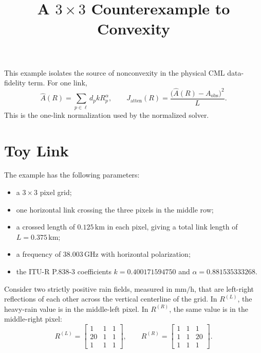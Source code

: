 \documentclass[11pt]{article}
\title{A $3\times3$ Counterexample to Convexity}
\author{}
\date{}
\begin{document}
\maketitle

This example isolates the source of nonconvexity in the physical CML
data-fidelity term. For one link,
\begin{equation}
    \widehat{A}(R)
    = \sum_{p\in\ell} d_p k R_p^\alpha,
    \qquad
    J_{\mathrm{atten}}(R)
    = \frac{\bigl(\widehat{A}(R)-A_{\mathrm{obs}}\bigr)^2}{L}.
\end{equation}
This is the one-link normalization used by the normalized solver.

\section{Toy Link}

The example has the following parameters:
\begin{itemize}
    \item a $3\times3$ pixel grid;
    \item one horizontal link crossing the three pixels in the middle row;
    \item a crossed length of $0.125\,\mathrm{km}$ in each pixel, giving a
          total link length of $L=0.375\,\mathrm{km}$;
    \item a frequency of $38.003\,\mathrm{GHz}$ with horizontal polarization;
    \item the ITU-R P.838-3 coefficients
          $k=0.400171594750$ and $\alpha=0.881535333268$.
\end{itemize}

Consider two strictly positive rain fields, measured in
$\mathrm{mm}/\mathrm{h}$, that are left-right reflections of each other
across the vertical centerline of the grid. In $R^{(L)}$, the heavy-rain
value is in the middle-left pixel. In $R^{(R)}$, the same value is in the
middle-right pixel:
\begin{equation}
    R^{(L)} =
    \begin{bmatrix}
        1 & 1 & 1 \\
        20 & 1 & 1 \\
        1 & 1 & 1
    \end{bmatrix},
    \qquad
    R^{(R)} =
    \begin{bmatrix}
        1 & 1 & 1 \\
        1 & 1 & 20 \\
        1 & 1 & 1
    \end{bmatrix}.
\end{equation}
\end{document}
